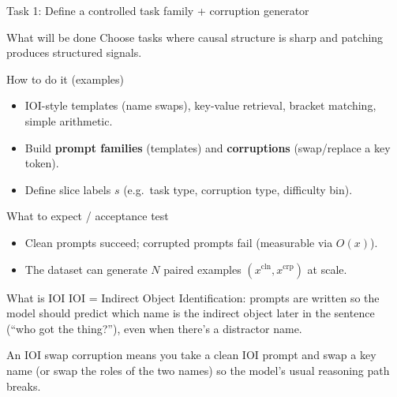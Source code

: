 \documentclass[aspectratio=169,xcolor={dvipsnames}]{beamer}
\renewcommand{\accent}[1]{\textbf{#1}}
\begin{document}
\begin{frame}[shrink=20]{Task 1: Define a controlled task family + corruption generator}
\small
\begin{block}{What will be done}
Choose tasks where causal structure is sharp and patching produces structured signals.
\end{block}

\begin{block}{How to do it (examples)}
\begin{itemize}\setlength\itemsep{3pt}
\item IOI-style templates (name swaps), key-value retrieval, bracket matching, simple arithmetic.
\item Build \accent{prompt families} (templates) and \accent{corruptions} (swap/replace a key token).
\item Define slice labels $s$ (e.g.\ task type, corruption type, difficulty bin).
\end{itemize}
\end{block}

\begin{block}{What to expect / acceptance test}
\begin{itemize}\setlength\itemsep{2pt}
\item Clean prompts succeed; corrupted prompts fail (measurable via $O(x)$).
\item The dataset can generate $N$ paired examples $(x^{\mathrm{cln}},x^{\mathrm{crp}})$ at scale.
\end{itemize}
\end{block}

\begin{alertblock}{What is IOI}
IOI = Indirect Object Identification: prompts are written so the model should predict which name is the indirect object later in the sentence (“who got the thing?”), even when there’s a distractor name.

An IOI swap corruption means you take a clean IOI prompt and swap a key name (or swap the roles of the two names) so the model’s usual reasoning path breaks.
\end{alertblock}


\end{frame}
\end{document}
